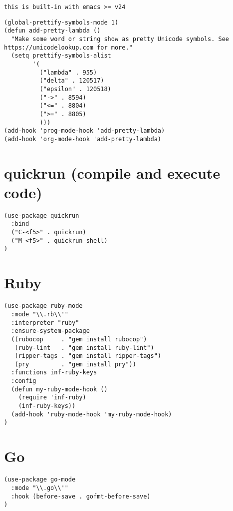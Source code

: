 \documentclass[11pt]{article}
\begin{document}
\begin{verbatim}
this is built-in with emacs >= v24
\end{verbatim}

\begin{verbatim}
(global-prettify-symbols-mode 1)
(defun add-pretty-lambda ()
  "Make some word or string show as pretty Unicode symbols. See https://unicodelookup.com for more."
  (setq prettify-symbols-alist
        '(
          ("lambda" . 955)
          ("delta" . 120517)
          ("epsilon" . 120518)
          ("->" . 8594)
          ("<=" . 8804)
          (">=" . 8805)
          )))
(add-hook 'prog-mode-hook 'add-pretty-lambda)
(add-hook 'org-mode-hook 'add-pretty-lambda)
\end{verbatim}

\section*{quickrun (compile and execute code)}
\label{sec:org475240c}
\begin{verbatim}
(use-package quickrun
  :bind
  ("C-<f5>" . quickrun)
  ("M-<f5>" . quickrun-shell)
)
\end{verbatim}


\section*{Ruby}
\label{sec:orgee40c79}
\begin{verbatim}
(use-package ruby-mode
  :mode "\\.rb\\'"
  :interpreter "ruby"
  :ensure-system-package
  ((rubocop     . "gem install rubocop")
   (ruby-lint   . "gem install ruby-lint")
   (ripper-tags . "gem install ripper-tags")
   (pry         . "gem install pry"))
  :functions inf-ruby-keys
  :config
  (defun my-ruby-mode-hook ()
    (require 'inf-ruby)
    (inf-ruby-keys))
  (add-hook 'ruby-mode-hook 'my-ruby-mode-hook)
)
\end{verbatim}

\section*{Go}
\label{sec:org060550b}

\begin{verbatim}
(use-package go-mode
  :mode "\\.go\\'"
  :hook (before-save . gofmt-before-save)
)
\end{verbatim}
\end{document}
